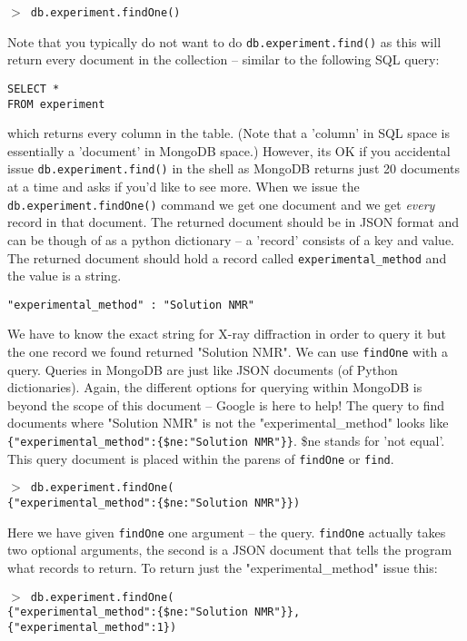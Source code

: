 \documentclass[12pt]{article}
\newcommand{\mdbcmdline}[1]{\vspace{5mm} \noindent
\texttt{$>$ #1}
\vspace{5mm}

}
\begin{document}
\mdbcmdline{db.experiment.findOne()}
\noindent
Note that you typically do not want to do \texttt{db.experiment.find()} as this will return every document in the collection -- similar to the following SQL query:

\vspace{5mm}
\noindent
\texttt{SELECT *\\
FROM experiment}

\vspace{5mm}
\noindent
which returns every column in the table. 
(Note that a 'column' in SQL space is essentially a 'document' in MongoDB space.)
However, its OK if you accidental issue \texttt{db.experiment.find()} in the shell as MongoDB returns just 20 documents at a time and asks if you'd like to see more.
When we issue the \texttt{db.experiment.findOne()} command we get one document and we get \textit{every} record in that document.
The returned document should be in JSON format and can be though of as a python dictionary -- a 'record' consists of a key and value.
The returned document should hold a record called \texttt{experimental\_method} and the value is a string.

\vspace{5mm}
\noindent
\texttt{"experimental\_method" : "Solution NMR"}

\vspace{5mm}
\noindent
We have to know the exact string for X-ray diffraction in order to query it but the one record we found returned "Solution NMR".
We can use \texttt{findOne} with a query.
Queries in MongoDB are just like JSON documents (of Python dictionaries).
Again, the different options for querying within MongoDB is beyond the scope of this document -- Google is here to help!
The query to find documents where "Solution NMR" is not the "experimental\_method" looks like \texttt{\{"experimental\_method":\{\$ne:"Solution NMR"\}\}}. \$ne stands for 'not equal'.
This query document is placed within the parens of \texttt{findOne} or \texttt{find}.

\mdbcmdline{db.experiment.findOne(\\
\{"experimental\_method":\{\$ne:"Solution NMR"\}\})}
\noindent
Here we have given \texttt{findOne} one argument -- the query. 
\texttt{findOne} actually takes two optional arguments, the second is a JSON document that tells the program what records to return.
To return just the "experimental\_method" issue this:

\mdbcmdline{db.experiment.findOne(\\
\{"experimental\_method":\{\$ne:"Solution NMR"\}\}, \\
\{"experimental\_method":1\})
}
\end{document}
